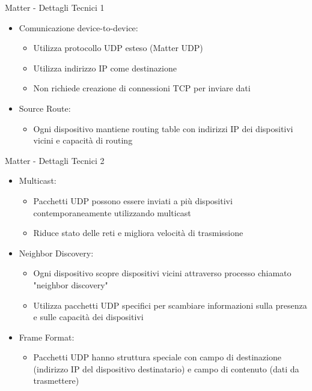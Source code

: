 \documentclass{beamer}
\begin{document}
	\begin{frame}{Matter - Dettagli Tecnici 1}
	\begin{itemize}
		\item Comunicazione device-to-device:
		\begin{itemize}
			\item Utilizza protocollo UDP esteso (Matter UDP)
			\item Utilizza indirizzo IP come destinazione
			\item Non richiede creazione di connessioni TCP per inviare dati
		\end{itemize}
		\item Source Route:
		\begin{itemize}
			\item Ogni dispositivo mantiene routing table con indirizzi IP dei dispositivi vicini e capacità di routing
		\end{itemize}
	\end{itemize}
\end{frame}
\begin{frame}{Matter - Dettagli Tecnici 2}
	\begin{itemize}
		\item Multicast:
		\begin{itemize}
			\item Pacchetti UDP possono essere inviati a più dispositivi contemporaneamente utilizzando multicast
			\item Riduce stato delle reti e migliora velocità di trasmissione
		\end{itemize}
		\item Neighbor Discovery:
		\begin{itemize}
			\item Ogni dispositivo scopre dispositivi vicini attraverso processo chiamato "neighbor discovery"
			\item Utilizza pacchetti UDP specifici per scambiare informazioni sulla presenza e sulle capacità dei dispositivi
		\end{itemize}
		\item Frame Format:
		\begin{itemize}
			\item Pacchetti UDP hanno struttura speciale con campo di destinazione (indirizzo IP del dispositivo destinatario) e campo di contenuto (dati da trasmettere)
		\end{itemize}
	\end{itemize}
\end{frame}
\end{document}
